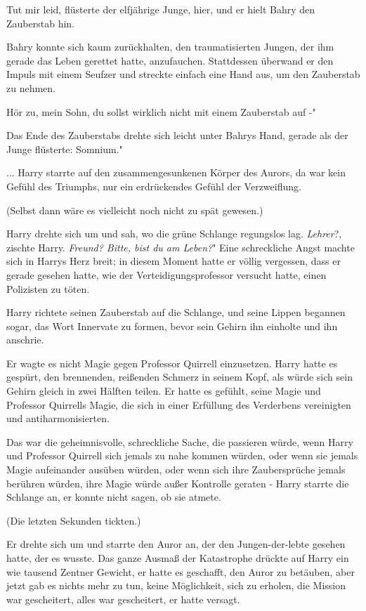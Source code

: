 \glqq Tut mir leid\grqq{}, flüsterte der elfjährige Junge, \glqq hier\grqq{},
und er hielt Bahry den Zauberstab hin.

Bahry konnte sich kaum zurückhalten, den traumatisierten Jungen, der ihm gerade
das Leben gerettet hatte, anzufauchen. Stattdessen überwand er den Impuls mit
einem Seufzer und streckte einfach eine Hand aus, um den Zauberstab zu nehmen.

\glqq Hör zu, mein Sohn, du sollst wirklich nicht mit einem Zauberstab auf -"

Das Ende des Zauberstabs drehte sich leicht unter Bahrys Hand, gerade als der
Junge flüsterte: \glqq Somnium."


... Harry starrte auf den zusammengesunkenen Körper des Aurors, da war kein
Gefühl des Triumphs, nur ein erdrückendes Gefühl der Verzweiflung.

(Selbst dann wäre es vielleicht noch nicht zu spät gewesen.)

Harry drehte sich um und sah, wo die grüne Schlange regungslos lag. \glqq
\emph{Lehrer}?\grqq{}, zischte Harry. \glqq \emph{Freund? Bitte, bist du am
Leben?}" Eine schreckliche Angst machte sich in Harrys Herz breit; in diesem
Moment hatte er völlig vergessen, dass er gerade gesehen hatte, wie der
Verteidigungsprofessor versucht hatte, einen Polizisten zu töten.

Harry richtete seinen Zauberstab auf die Schlange, und seine Lippen begannen
sogar, das Wort Innervate zu formen, bevor sein Gehirn ihn einholte und ihn
anschrie.

Er wagte es nicht Magie gegen Professor Quirrell einzusetzen. Harry hatte es
gespürt, den brennenden, reißenden Schmerz in seinem Kopf, als würde sich sein
Gehirn gleich in zwei Hälften teilen. Er hatte es gefühlt, seine Magie und
Professor Quirrells Magie, die sich in einer Erfüllung des Verderbens
vereinigten und antiharmonisierten.

Das war die geheimnisvolle, schreckliche Sache, die passieren würde, wenn Harry
und Professor Quirrell sich jemals zu nahe kommen würden, oder wenn sie jemals
Magie aufeinander ausüben würden, oder wenn sich ihre Zaubersprüche jemals
berühren würden, ihre Magie würde außer Kontrolle geraten - Harry starrte die
Schlange an, er konnte nicht sagen, ob sie atmete.

(Die letzten Sekunden tickten.)

Er drehte sich um und starrte den Auror an, der den Jungen-der-lebte gesehen
hatte, der es wusste. Das ganze Ausmaß der Katastrophe drückte auf Harry ein wie
tausend Zentner Gewicht, er hatte es geschafft, den Auror zu betäuben, aber
jetzt gab es nichts mehr zu tun, keine Möglichkeit, sich zu erholen, die Mission
war gescheitert, alles war gescheitert, er hatte versagt.

